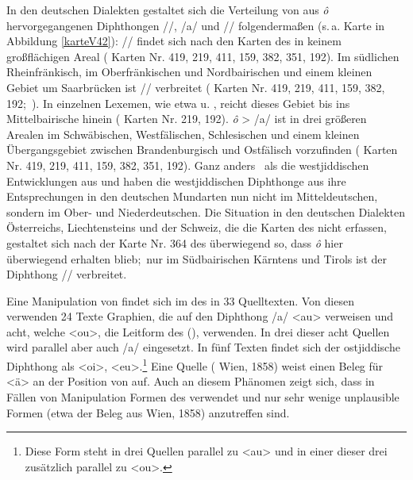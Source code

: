  In den deutschen Dialekten gestaltet sich die Verteilung von aus {\mhd} \textit{ô} hervorgegangenen Diphthongen  /\textopeno {}/, /a/ und  /\textopeno \textsubarch{\textsci}/ folgendermaßen (s.\,a. Karte in Abbildung \ref{karteV42}): /\textopeno \textsubarch{\textsci}/ findet sich nach den Karten des  in keinem großflächigen  Areal ( Karten Nr. 419, 219, 411, 159, 382, 351, 192). Im südlichen Rheinfränkisch, im Oberfränkischen und Nordbairischen und einem kleinen Gebiet um Saarbrücken ist /\textopeno {}/ verbreitet ( Karten Nr. 419, 219, 411, 159, 382, 192;\,  \citealt[237]{Schirmunski1962}). In einzelnen Lexemen, wie etwa  u. , reicht dieses Gebiet bis ins Mittelbairische hinein ( Karten Nr. 219, 192). {\mhd} \textit{ô} > /a/ ist in drei größeren Arealen im Schwäbischen, Westfälischen, Schlesischen und einem kleinen Übergangsgebiet zwischen Brandenburgisch und Ostfälisch vorzufinden ( Karten Nr. 419, 219, 411, 159, 382, 351, 192). Ganz anders \,%
 als die westjiddischen Entwicklungen aus  und  haben die westjiddischen Diphthonge aus  ihre Entsprechungen in den deutschen Mundarten nun nicht im Mitteldeutschen, sondern im Ober- und Niederdeutschen. Die Situation in den deutschen Dialekten Österreichs, Liechtensteins und der Schweiz, die die Karten des  nicht erfassen, gestaltet sich nach der Karte Nr. 364 des  überwiegend so, dass {\mhd} \textit{ô} hier überwiegend erhalten blieb;\, nur im Südbairischen Kärntens und Tirols ist der Diphthong /\textopeno {}/ verbreitet.

Eine Manipulation von  findet sich im  des  in 33 Quelltexten. Von diesen verwenden 24 Texte Graphien, die auf den Diphthong /a/ <au> verweisen und acht, welche <ou>, die Leitform des  (\citealt[79]{Herzog1992}), verwenden. In drei dieser acht Quellen wird  parallel  aber auch /a/ eingesetzt. In fünf Texten findet sich der ostjiddische Diphthong als <oi>, <eu>.\footnote{Diese Form steht in drei Quellen parallel zu <au> und in einer dieser drei zusätzlich parallel zu <ou>.} Eine Quelle ( Wien, 1858) weist einen Beleg für <ä> an der Position von  auf. Auch an diesem Phänomen zeigt sich, dass  in Fällen von Manipulation Formen des \hai{{\WJ}} verwendet und nur sehr wenige unplausible Formen (etwa der Beleg aus  Wien, 1858) anzutreffen sind. 


